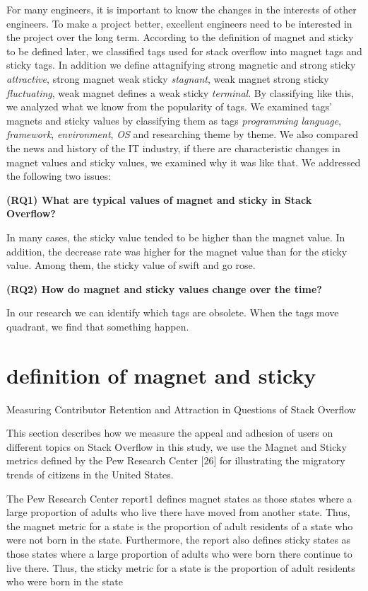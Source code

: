 \documentclass[conference]{IEEEtran}
\begin{document}
\smallskip
For many engineers, it is important to know the changes in the interests of other engineers. To make a project better, excellent engineers need to be interested in the project over the long term. According to the definition of magnet and sticky to be defined later, we classified tags used for stack overflow into magnet tags and sticky tags. In addition we define attagnifying strong magnetic and strong sticky \emph{attractive}, strong magnet weak sticky \emph{stagnant}, weak magnet strong sticky \emph{fluctuating}, weak magnet defines a weak sticky \emph{terminal}. By classifying like this, we analyzed what we know from the popularity of tags. We examined tags' magnets and sticky values by classifying them as tags \emph{programming language}, \emph{framework}, \emph{environment}, \emph{OS} and researching theme by theme. We also compared the news and history of the IT industry, if there are characteristic changes in magnet values and sticky values, we examined why it was like that. We addressed the following two issues:
\par
\smallskip

\textbf{(RQ1) What are typical values of magnet and sticky in Stack Overflow?}\par
In many cases, the sticky value tended to be higher than the magnet value. In addition, the decrease rate was higher for the magnet value than for the sticky value. Among them, the sticky value of swift and go rose.
\smallskip

\textbf{(RQ2) How do magnet and sticky values change over the time?}\par
In our research we can identify which tags are obsolete. When the tags move quadrant, we find that something happen.

\section{definition of magnet and sticky}
Measuring Contributor Retention and Attraction in Questions of Stack Overflow

This section describes how we measure the appeal and adhesion of users on different topics on Stack Overflow in this study, we use the Magnet and Sticky metrics defined by the Pew Research Center [26] for illustrating the migratory trends of citizens in the United States.

The Pew Research Center report1 defines magnet states as those states where a large proportion of adults who live there have moved from another state. Thus, the magnet metric for a state is the proportion of adult residents of a state who were not born in the state. Furthermore, the report also defines sticky states as those states where a large proportion of adults who were born there continue to live there. Thus, the sticky metric for a state is the proportion of adult residents who were born in the state
\end{document}
